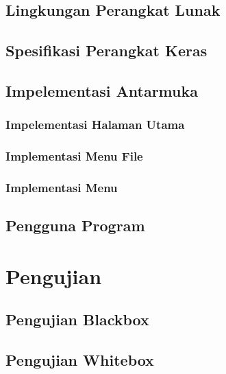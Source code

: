 \subsection{Lingkungan Perangkat Lunak}

\subsection{Spesifikasi Perangkat Keras}

\subsection{Impelementasi Antarmuka}

\subsubsection{Impelementasi Halaman Utama}

\subsubsection{Implementasi Menu File}

\subsubsection{Implementasi Menu}

\subsection{Pengguna Program}

\section{Pengujian}

\subsection{Pengujian Blackbox}

\subsection{Pengujian Whitebox}

\newpage